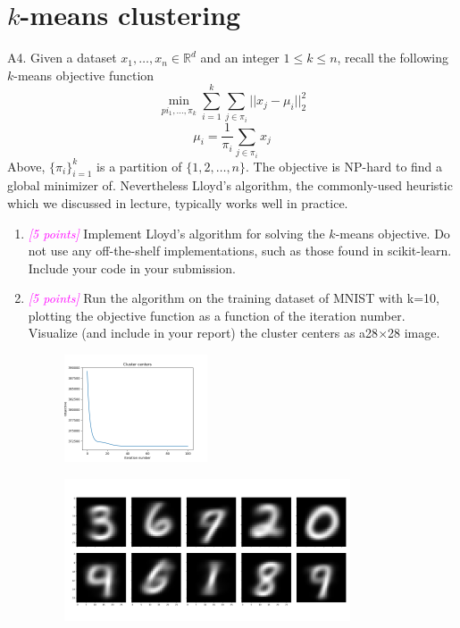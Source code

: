 \documentclass{article}
\newcommand{\field}[1]{\mathbb{#1}}
\newcommand{\1}{\mathbf{1}}
\newcommand{\R}{\field{R}} %
\newcommand{\points}[1]{\small\textcolor{magenta}{\emph{[#1 points]}} \normalsize}
\begin{document}
\newpage
\section*{$k$-means clustering}
A4. Given a dataset $x_1,\hdots, x_n \in\R^d$ and an integer $1\leq k \leq n$, recall the following $k$-means objective function 
$$\min_{pi_1,\hdots,\pi_k} \sum_{i=1}^k\sum_{j\in\pi_i} ||x_j-\mu_i||^2_2$$
$$\mu_i=\frac{1}{\pi_i} \sum_{j\in\pi_i} x_j$$
Above, $\{\pi_i\}^k_{i=1}$ is a partition of $\{1,2,\hdots,n\}$. The objective is NP-hard to find a global minimizer of. Nevertheless Lloyd’s algorithm, the commonly-used heuristic which we discussed in lecture, typically works well in practice.
\begin{enumerate}
    \item \points{5} Implement Lloyd’s algorithm for solving the $k$-means objective. Do not use any off-the-shelf implementations, such as those found in scikit-learn.  Include your code in your submission.
    
    
    \item \points{5} Run the algorithm on the training dataset of MNIST with k=10, plotting the objective function as a function of the iteration number. Visualize (and include in your report) the cluster centers as a28$\times$28 image.
    \begin{figure}[h!]
    \centering 
    \includegraphics[width=0.4\textwidth]{HW3/HW3_plots/A4b_Objective.png}
    \end{figure}
    \begin{figure}[h!]
    \centering 
    \includegraphics[width=0.8\textwidth]{HW3/HW3_plots/A4b_Centers.png}
    \end{figure}
    

\end{enumerate}
\end{document}
